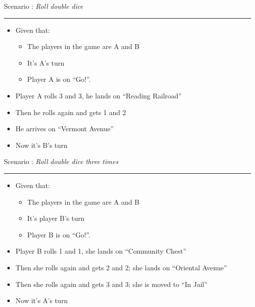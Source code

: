 \documentclass[handout,t,12pt]{beamer}
\newcommand{\Square}[1]{``#1''}
\newcounter{scenarioid}\setcounter{scenarioid}{0}
\newenvironment{scenario}[1]{%
\addtocounter{scenarioid}{1} 
{\Large Scenario \thescenarioid: \emph{#1}\\[3px]\hrule}
\vspace{1\bigskipamount}
}{%
}
\begin{document}
  \begin{frame}
    \begin{scenario}{Roll double dice}
      \begin{itemize}
        \item Given that:
        \begin{itemize}
          \item The players in the game are A and B
          \item It's A's turn
          \item Player A is on \Square{Go!}.
        \end{itemize}
        \item Player A rolls 3 and 3, he lands on \Square{Reading Railroad}
        \item Then he rolls again and gets 1 and 2
        \item He arrives on \Square{Vermont Avenue}
        \item Now it's B's turn
      \end{itemize}
    \end{scenario}
  \end{frame}

  \begin{frame}
    \begin{scenario}{Roll double dice three times}
      \begin{itemize}
        \item Given that:
        \begin{itemize}
          \item The players in the game are A and B
          \item It's player B's turn
          \item Player B is on \Square{Go!}.
        \end{itemize}
        \item Player B rolls 1 and 1, she lands on \Square{Community Chest}
        \item Then she rolls again and gets 2 and 2; she lands on \Square{Oriental Avenue}
        \item Then she rolls again and gets 3 and 3; she is moved to \Square{In Jail}
        \item Now it's A's turn
      \end{itemize}
    \end{scenario}
  \end{frame}
  
\end{document}
